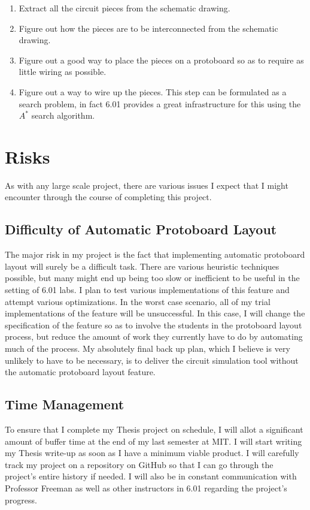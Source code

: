 \documentclass[12pt, doublespacing]{amsart}
\begin{document}
\begin{enumerate}
\item Extract all the circuit pieces from the schematic drawing.
\item Figure out how the pieces are to be interconnected from the schematic drawing.
\item Figure out a good way to place the pieces on a protoboard so as to require as little wiring as possible.
\item Figure out a way to wire up the pieces. This step can be formulated as a search problem, in fact 6.01 provides a great infrastructure for this using the $A^*$ search algorithm\cite{6.01search}.
\end{enumerate}

\section{Risks}
\label{sec:risks}
As with any large scale project, there are various issues I expect that I might encounter through the course of completing this project.

\subsection{Difficulty of Automatic Protoboard Layout}

The major risk in my project is the fact that implementing automatic protoboard layout will surely be a difficult task. There are various heuristic techniques possible, but many might end up being too slow or inefficient to be useful in the setting of 6.01 labs. I plan to test various implementations of this feature and attempt various optimizations. In the worst case scenario, all of my trial implementations of the feature will be unsuccessful. In this case, I will change the specification of the feature so as to involve the students in the protoboard layout process, but reduce the amount of work they currently have to do by automating much of the process. My absolutely final back up plan, which I believe is very unlikely to have to be necessary, is to deliver the circuit simulation tool without the automatic protoboard layout feature.

\subsection{Time Management}

To ensure that I complete my Thesis project on schedule, I will allot a significant amount of buffer time at the end of my last semester at MIT. I will start writing my Thesis write-up as soon as I have a minimum viable product. I will carefully track my project on a repository on GitHub so that I can go through the project's entire history if needed. I will also be in constant communication with Professor Freeman as well as other instructors in 6.01 regarding the project's progress.
\end{document}
